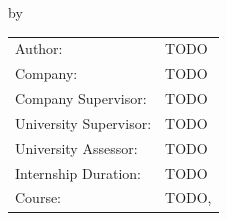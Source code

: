 \begin{titlepage}

\begin{center}

 \bigskip
\bigskip
{\makeatletter
{}\fontsize{30}{30}\selectfont\@title
\makeatother}

{\makeatletter
\ifdefvoid{\@subtitle}{}{\bigskip\titlestyle\fontsize{20}{20}\selectfont\@subtitle}
\makeatother}

\bigskip
\bigskip

{\fontsize{20}{20}\selectfont{}\selectfont by}

\bigskip
\bigskip

{\makeatletter
{}\fontsize{25}{25}\selectfont\@author
\makeatother}

\bigskip
\bigskip

\setlength\extrarowheight{2pt}

\vfill

\begin{tabular}{ll}
    Author: & TODO \\
    Company: & TODO \\
    Company Supervisor: & TODO \\
    University Supervisor: & TODO \\
    University Assessor: & TODO \\
    Internship Duration: & TODO \\
    Course: & TODO,
\end{tabular}

\bigskip
\bigskip

\end{center}


\end{titlepage}
